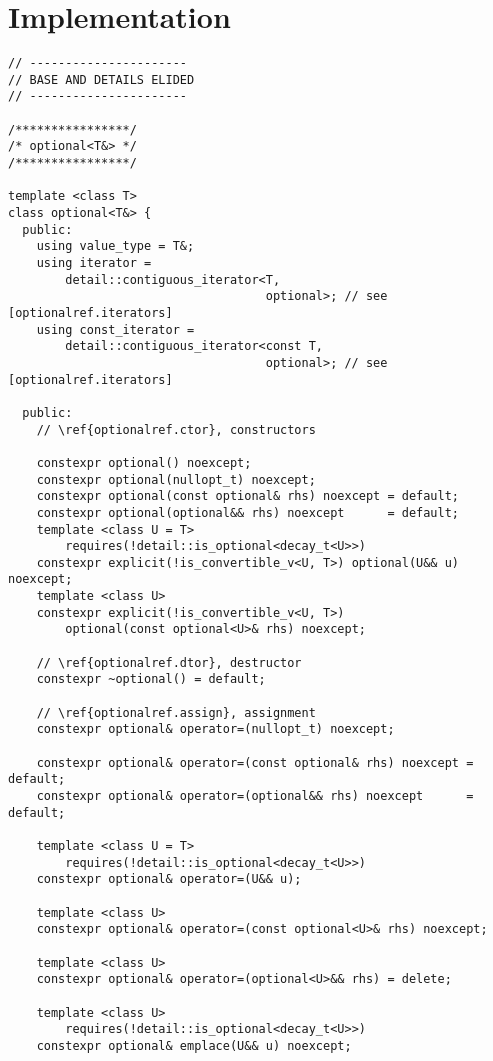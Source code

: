 \documentclass[a4paper,10pt,oneside,openany,final,article]{memoir}
\begin{document}
\renewcommand{\bibname}{References}




\backmatter
\chapter*{Implementation}

\begin{verbatim}
// ----------------------
// BASE AND DETAILS ELIDED
// ----------------------

/****************/
/* optional<T&> */
/****************/

template <class T>
class optional<T&> {
  public:
    using value_type = T&;
    using iterator =
        detail::contiguous_iterator<T,
                                    optional>; // see [optionalref.iterators]
    using const_iterator =
        detail::contiguous_iterator<const T,
                                    optional>; // see [optionalref.iterators]

  public:
    // \ref{optionalref.ctor}, constructors

    constexpr optional() noexcept;
    constexpr optional(nullopt_t) noexcept;
    constexpr optional(const optional& rhs) noexcept = default;
    constexpr optional(optional&& rhs) noexcept      = default;
    template <class U = T>
        requires(!detail::is_optional<decay_t<U>>)
    constexpr explicit(!is_convertible_v<U, T>) optional(U&& u) noexcept;
    template <class U>
    constexpr explicit(!is_convertible_v<U, T>)
        optional(const optional<U>& rhs) noexcept;

    // \ref{optionalref.dtor}, destructor
    constexpr ~optional() = default;

    // \ref{optionalref.assign}, assignment
    constexpr optional& operator=(nullopt_t) noexcept;

    constexpr optional& operator=(const optional& rhs) noexcept = default;
    constexpr optional& operator=(optional&& rhs) noexcept      = default;

    template <class U = T>
        requires(!detail::is_optional<decay_t<U>>)
    constexpr optional& operator=(U&& u);

    template <class U>
    constexpr optional& operator=(const optional<U>& rhs) noexcept;

    template <class U>
    constexpr optional& operator=(optional<U>&& rhs) = delete;

    template <class U>
        requires(!detail::is_optional<decay_t<U>>)
    constexpr optional& emplace(U&& u) noexcept;


\end{verbatim}
\end{document}

